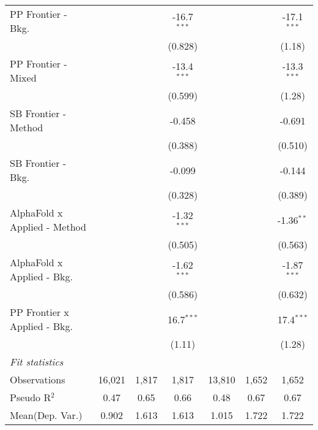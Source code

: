 \begin{tabular}{lcccccc}
   PP Frontier - Bkg.           &                &               & -16.7$^{***}$ &                &               & -17.1$^{***}$\\   
                                &                &               & (0.828)       &                &               & (1.18)\\   
   PP Frontier - Mixed          &                &               & -13.4$^{***}$ &                &               & -13.3$^{***}$\\   
                                &                &               & (0.599)       &                &               & (1.28)\\   
   SB Frontier - Method         &                &               & -0.458        &                &               & -0.691\\   
                                &                &               & (0.388)       &                &               & (0.510)\\   
   SB Frontier - Bkg.           &                &               & -0.099        &                &               & -0.144\\   
                                &                &               & (0.328)       &                &               & (0.389)\\   
   AlphaFold x Applied - Method &                &               & -1.32$^{***}$ &                &               & -1.36$^{**}$\\   
                                &                &               & (0.505)       &                &               & (0.563)\\   
   AlphaFold x Applied - Bkg.   &                &               & -1.62$^{***}$ &                &               & -1.87$^{***}$\\   
                                &                &               & (0.586)       &                &               & (0.632)\\   
   PP Frontier x Applied - Bkg. &                &               & 16.7$^{***}$  &                &               & 17.4$^{***}$\\   
                                &                &               & (1.11)        &                &               & (1.28)\\   
   \midrule
   \emph{Fit statistics}\\
   Observations                 & 16,021         & 1,817         & 1,817         & 13,810         & 1,652         & 1,652\\  
   Pseudo R$^2$                 & 0.47           & 0.65          & 0.66          & 0.48           & 0.67          & 0.67\\  
Mean(Dep. Var.) & 0.902 & 1.613 & 1.613 & 1.015 & 1.722 & 1.722 \\
   

\end{tabular}
